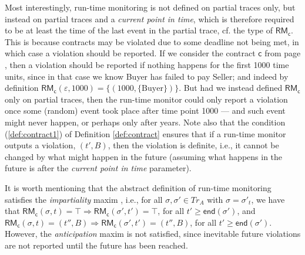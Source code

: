 \documentclass[orivec,final]{llncs-href}
\newcommand{\traceset}[1]{\mathit{Tr}_{#1}}
\newcommand{\traceend}{\mathsf{end}}
\newcommand{\rmf}{\mathsf{RM}}
\newcommand{\trace}{\sigma}
\newcommand{\conforming}{\top}
\newcommand{\emptytrace}{\varepsilon}
\newcommand{\contract}{\mathsf{c}}
\begin{document}
Most interestingly, run-time monitoring is not defined on partial
traces only, but instead on partial traces and a \emph{current
  point in time}, which is therefore required to be at least the time
of the last event in the partial trace, cf. the type of
$\rmf_\contract$. This is because contracts may be violated due to
some deadline not being met, in which case a violation should be
reported. If we consider the contract $\contract$ from
page \pageref{abstractexamplecontract}, then a violation should be
reported if nothing happens for the first 1000 time units, since in
that case we know Buyer has failed to pay Seller; and indeed by
definition $\rmf_\contract(\emptytrace,1000) =
\{(1000,\{\mathrm{Buyer}\})\}$. But had we instead defined
$\rmf_\contract$ only on partial traces, then the run-time monitor
could only report a violation once some (random) event took place
after time point 1000 --- and such event might never happen, or
perhaps only after years. Note also that the condition
(\ref{def:contract1}) of Definition \ref{def:contract} ensures that if
a run-time monitor outputs a violation, $(t',B)$, then the violation
is definite, i.e., it cannot be changed by what might happen in the
future (assuming what happens in the future is after the
\emph{current point in time} parameter).

It is worth mentioning that the abstract definition of run-time
monitoring satisfies the \emph{impartiality} maxim \cite{leucker09rv},
i.e., for all $\trace,\trace' \in \traceset{A}$ with $\trace =
\trace'_t$, we have that $\rmf_\contract(\trace,t) = \conforming
\Rightarrow \rmf_\contract(\trace',t') = \conforming$, for all $t'
\geq \traceend(\trace')$, and $\rmf_\contract(\trace,t) = (t'',B)
\Rightarrow \rmf_\contract(\trace',t') = (t'',B)$, for all $t' \geq
\traceend(\trace')$. However, the \emph{anticipation} maxim 
\cite{leucker09rv} is not satisfied, since inevitable future
violations are not reported until the future has been reached.
\end{document}
